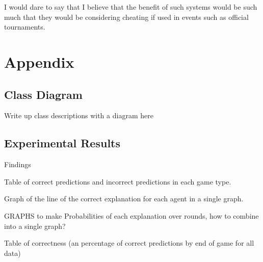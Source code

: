 \documentclass[parskip]{cs4rep}
\begin{document}
I would dare to say that I believe that the benefit of such systems would be such much that they would be considering cheating if used in events such as official tournaments.

\chapter{Appendix}

\section{Class Diagram}

Write up class descriptions with a diagram here

\section{Experimental Results}

Findings

Table of correct predictions and incorrect predictions in each game type.

Graph of the line of the correct explanation for each agent in a single graph.

GRAPHS to make
Probabilities of each explanation over rounds, how to combine into a single graph?

Table of correctness (an percentage of correct predictions by end of game for all data)



\end{document}
